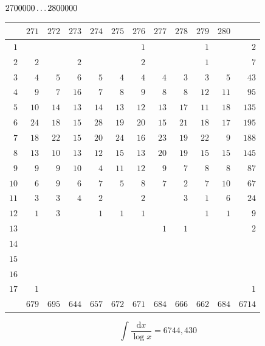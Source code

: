 \par\medskip
\noindent\begin{minipage}{\linewidth}\centering
{}
\(2700000\mathinner{.\,.\,.}2800000\)\par\smallskip
\begingroup\fontsize{10.5}{11.5}\selectfont\setlength{\tabcolsep}{3.5pt}\renewcommand{\arraystretch}{1}
\begin{tabular}{r|rrrrrrrrrr|r}\hline
 & $271$ & $272$ & $273$ & $274$ & $275$ & $276$ & $277$ & $278$ & $279$ & $280$ &  \\ \hline
$1$ &  &  &  &  &  & $1$ &  &  & $1$ &  & $2$ \\
$2$ & $2$ &  & $2$ &  &  & $2$ &  &  & $1$ &  & $7$ \\
$3$ & $4$ & $5$ & $6$ & $5$ & $4$ & $4$ & $4$ & $3$ & $3$ & $5$ & $43$ \\
$4$ & $9$ & $7$ & $16$ & $7$ & $8$ & $9$ & $8$ & $8$ & $12$ & $11$ & $95$ \\
$5$ & $10$ & $14$ & $13$ & $14$ & $13$ & $12$ & $13$ & $17$ & $11$ & $18$ & $135$ \\
$6$ & $24$ & $18$ & $15$ & $28$ & $19$ & $20$ & $15$ & $21$ & $18$ & $17$ & $195$ \\
$7$ & $18$ & $22$ & $15$ & $20$ & $24$ & $16$ & $23$ & $19$ & $22$ & $9$ & $188$ \\
$8$ & $13$ & $10$ & $13$ & $12$ & $15$ & $13$ & $20$ & $19$ & $15$ & $15$ & $145$ \\
$9$ & $9$ & $9$ & $10$ & $4$ & $11$ & $12$ & $9$ & $7$ & $8$ & $8$ & $87$ \\
$10$ & $6$ & $9$ & $6$ & $7$ & $5$ & $8$ & $7$ & $2$ & $7$ & $10$ & $67$ \\
$11$ & $3$ & $3$ & $4$ & $2$ &  & $2$ &  & $3$ & $1$ & $6$ & $24$ \\
$12$ & $1$ & $3$ &  & $1$ & $1$ & $1$ &  &  & $1$ & $1$ & $9$ \\
$13$ &  &  &  &  &  &  & $1$ & $1$ &  &  & $2$ \\
$14$ &  &  &  &  &  &  &  &  &  &  &  \\
$15$ &  &  &  &  &  &  &  &  &  &  &  \\
$16$ &  &  &  &  &  &  &  &  &  &  &  \\
$17$ & $1$ &  &  &  &  &  &  &  &  &  & $1$ \\
\hline
 & $679$ & $695$ & $644$ & $657$ & $672$ & $671$ & $684$ & $666$ & $662$ & $684$ & $6714$ \\ \hline
\end{tabular}\par\endgroup
\setlength{\abovedisplayskip}{6pt}\setlength{\belowdisplayskip}{4pt}
\[\int\frac{\mathrm{d}x}{\log x}=6744{,}430\]
\end{minipage}

